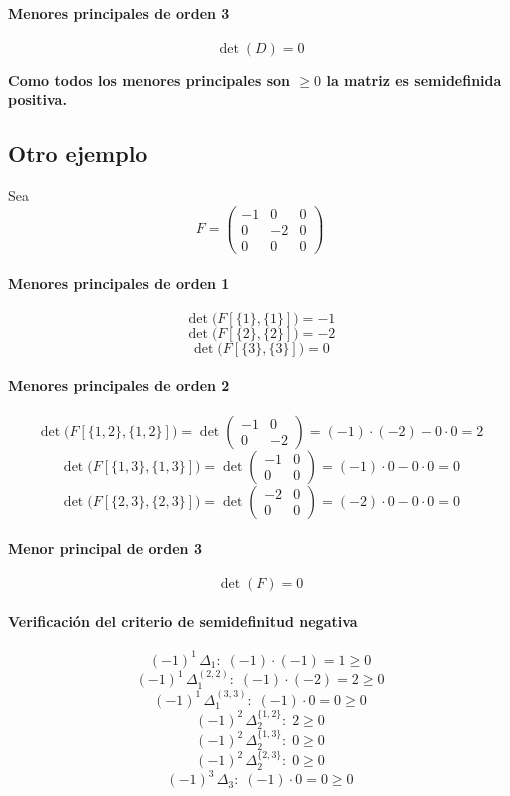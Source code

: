 \documentclass{article}
\begin{document}
\paragraph*{Menores principales de orden 3}  
\[
\det(D) = 0
\]

\textbf{\color{teal}Como todos los menores principales son \(\ge 0\) la matriz es semidefinida positiva.  }
\subsection*{Otro ejemplo}

Sea  
\[
F = \begin{pmatrix}
-1 & 0 & 0\\
0 & -2 & 0\\
0 & 0 & 0
\end{pmatrix}
\]

\paragraph*{Menores principales de orden 1}  
\[
\det\bigl(F[\{1\},\{1\}]\bigr) = -1
\]
\[
\det\bigl(F[\{2\},\{2\}]\bigr) = -2
\]
\[
\det\bigl(F[\{3\},\{3\}]\bigr) = 0
\]

\paragraph*{Menores principales de orden 2}  
\[
\det\bigl(F[\{1,2\},\{1,2\}]\bigr)
= \det\begin{pmatrix}-1 & 0\\0 & -2\end{pmatrix}
= (-1)\cdot(-2) - 0\cdot0
= 2
\]
\[
\det\bigl(F[\{1,3\},\{1,3\}]\bigr)
= \det\begin{pmatrix}-1 & 0\\0 & 0\end{pmatrix}
= (-1)\cdot0 - 0\cdot0
= 0
\]
\[
\det\bigl(F[\{2,3\},\{2,3\}]\bigr)
= \det\begin{pmatrix}-2 & 0\\0 & 0\end{pmatrix}
= (-2)\cdot0 - 0\cdot0
= 0
\]

\paragraph*{Menor principal de orden 3}  
\[
\det(F) = 0
\]

\paragraph*{Verificación del criterio de semidefinitud negativa}  
\[
(-1)^1\,\Delta_1:\;
(-1)\cdot(-1) = 1 \ge 0
\]
\[
(-1)^1\,\Delta_1^{(2,2)}:\;
(-1)\cdot(-2) = 2 \ge 0
\]
\[
(-1)^1\,\Delta_1^{(3,3)}:\;
(-1)\cdot0 = 0 \ge 0
\]
\[
(-1)^2\,\Delta_2^{\{1,2\}}:\;
2 \ge 0
\]
\[
(-1)^2\,\Delta_2^{\{1,3\}}:\;
0 \ge 0
\]
\[
(-1)^2\,\Delta_2^{\{2,3\}}:\;
0 \ge 0
\]
\[
(-1)^3\,\Delta_3:\;
(-1)\cdot0 = 0 \ge 0
\]
\end{document}
